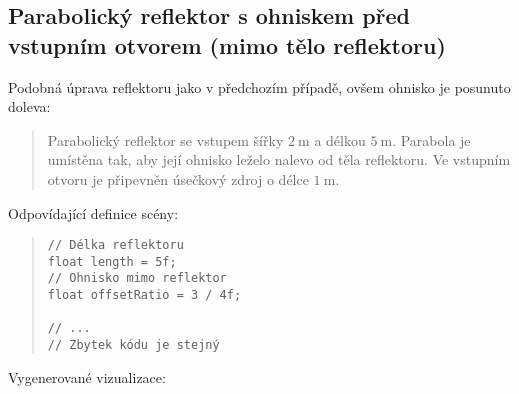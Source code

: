 \subsection[Parabolický reflektor s ohniskem před vstupním otvorem]{Parabolický reflektor s ohniskem před vstupním otvorem (mimo tělo reflektoru)}

Podobná úprava reflektoru jako v předchozím případě, ovšem ohnisko je posunuto doleva:

\begin{quote}
    Parabolický reflektor se vstupem šířky $2\ \mathrm{m}$ a délkou $5\ \mathrm{m}$. Parabola je umístěna tak, aby její ohnisko leželo nalevo od těla reflektoru. Ve vstupním otvoru je připevněn úsečkový zdroj o délce $1\ \mathrm{m}$.
\end{quote}

Odpovídající definice scény:

\begin{minipage}{\textwidth}\begin{quote}\begin{lstlisting}
// Délka reflektoru
float length = 5f;
// Ohnisko mimo reflektor
float offsetRatio = 3 / 4f;

// ...
// Zbytek kódu je stejný
\end{lstlisting}\end{quote}\end{minipage}

Vygenerované vizualizace:




